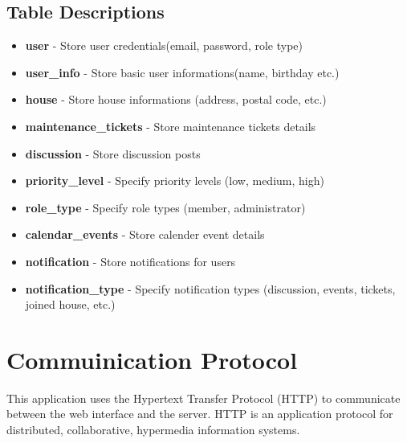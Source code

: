 \documentclass[12pt]{article}
\begin{document}
\subsection{Table Descriptions}
\begin{itemize}
    \item \textbf{user} - Store user credentials(email, password, role type)
    \item \textbf{user\_info} - Store basic user informations(name, birthday etc.)
    \item \textbf{house} - Store house informations (address, postal code, etc.)
    \item \textbf{maintenance\_tickets} - Store maintenance tickets details
    \item \textbf{discussion} - Store discussion posts
    \item \textbf{priority\_level} - Specify priority levels (low, medium, high)
    \item \textbf{role\_type} - Specify role types (member, administrator)
    \item \textbf{calendar\_events} - Store calender event details
    \item \textbf{notification} - Store notifications for users
    \item \textbf{notification\_type} - Specify notification types (discussion, events, tickets, joined house, etc.)

\end{itemize}

%
\section{Commuinication Protocol}
This application uses the Hypertext Transfer Protocol (HTTP) to communicate between the web interface and the server. HTTP is an application protocol for distributed, collaborative, hypermedia information systems.

%
\end{document}
